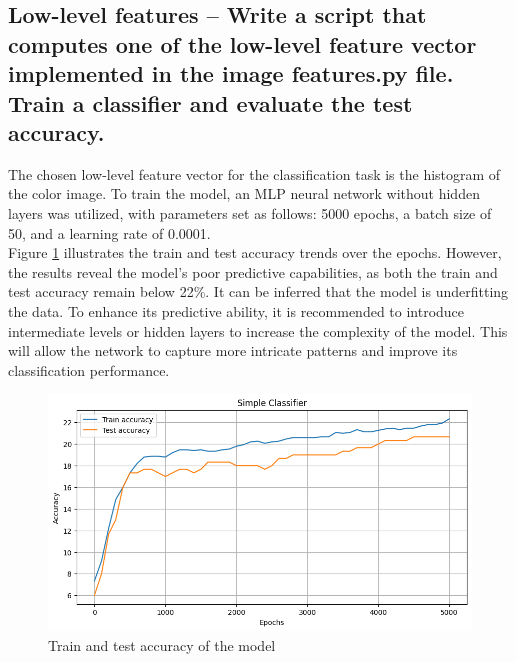 \documentclass{class}
\begin{document}
\subsection{Low-level features -- Write a script that computes one of the low-level feature vector implemented in the
    image features.py file. Train a classifier and evaluate the test accuracy.}
The chosen low-level feature vector for the classification task is the histogram of the color image.
To train the model, an MLP neural network without hidden layers was utilized, with parameters set as follows: 5000 epochs, a batch size of 50,
and a learning rate of 0.0001.\\
Figure \ref{fig-1} illustrates the train and test accuracy trends over the epochs.
However, the results reveal the model's poor predictive capabilities, as both the train and test accuracy remain below 22\%.
It can be inferred that the model is underfitting the data. To enhance its predictive ability,
it is recommended to introduce intermediate levels or hidden layers to increase the complexity of the model.
This will allow the network to capture more intricate patterns and improve its classification performance.
\begin{figure}[h]
    \centering
    \includegraphics[width=.8\columnwidth]{images/1.1_simple_model.png}
    \caption{Train and test accuracy of the model}
    \label{fig-1}
\end{figure}
\end{document}
